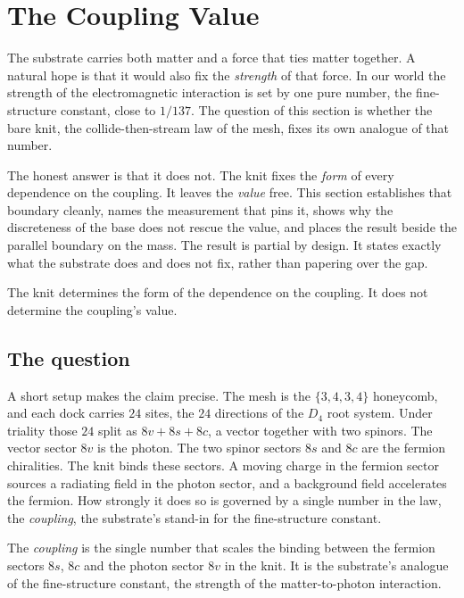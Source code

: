 \section{The Coupling Value}

The substrate carries both matter and a force that ties matter together. A natural hope is that it would also fix the \emph{strength} of that force. In our world the strength of the electromagnetic interaction is set by one pure number, the fine-structure constant, close to $1/137$. The question of this section is whether the bare knit, the collide-then-stream law of the mesh, fixes its own analogue of that number.

The honest answer is that it does not. The knit fixes the \emph{form} of every dependence on the coupling. It leaves the \emph{value} free. This section establishes that boundary cleanly, names the measurement that pins it, shows why the discreteness of the base does not rescue the value, and places the result beside the parallel boundary on the mass. The result is partial by design. It states exactly what the substrate does and does not fix, rather than papering over the gap.

\begin{principle}
The knit determines the form of the dependence on the coupling. It does not determine the coupling's value.
\end{principle}

\subsection{The question}

A short setup makes the claim precise. The mesh is the $\{3,4,3,4\}$ honeycomb, and each dock carries $24$ sites, the $24$ directions of the $D_4$ root system. Under triality those $24$ split as $8v + 8s + 8c$, a vector together with two spinors. The vector sector $8v$ is the photon. The two spinor sectors $8s$ and $8c$ are the fermion chiralities. The knit binds these sectors. A moving charge in the fermion sector sources a radiating field in the photon sector, and a background field accelerates the fermion. How strongly it does so is governed by a single number in the law, the \emph{coupling}, the substrate's stand-in for the fine-structure constant.

\begin{definition}
The \emph{coupling} is the single number that scales the binding between the fermion sectors $8s$, $8c$ and the photon sector $8v$ in the knit. It is the substrate's analogue of the fine-structure constant, the strength of the matter-to-photon interaction.
\end{definition}

